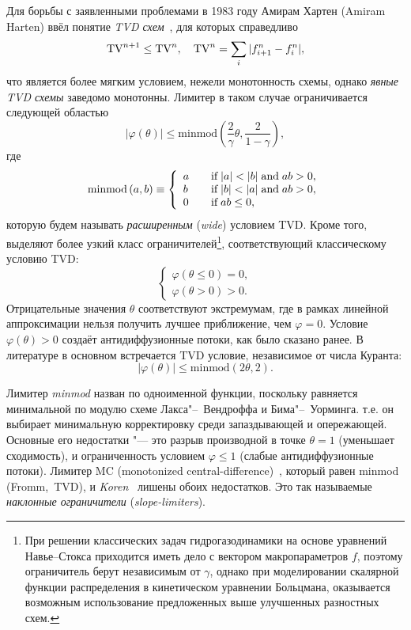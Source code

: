 Для борьбы с заявленными проблемами в 1983 году Амирам Хартен (Amiram Harten) ввёл понятие \textit{TVD схем}~\cite{Harten1983},
для которых справедливо
\[ \mathrm{TV}^{n+1}\le \mathrm{TV}^n, \quad \mathrm{TV}^n = \sum_i| f_{i+1}^n - f_i^n |, \]
что является более мягким условием, нежели монотонность схемы, однако \textit{явные TVD схемы} заведомо монотонны.
Лимитер в таком случае ограничивается следующей областью
\[ \left|\varphi(\theta)\right| \leq \mathrm{minmod}\left(\frac2{\gamma}\theta,\frac2{1-\gamma}\right), \] где
\[
\mathrm{minmod}\,(a,b) \equiv \left\{
\begin{array}{l l}
	a & \quad \text{if}\;|a|<|b| \;\text{and}\;ab>0, \\
	b & \quad \text{if}\;|b|<|a| \;\text{and}\;ab>0, \\
	0 & \quad \text{if}\;ab \leq 0,
\end{array}\right.
\]
которую будем называть \textit{расширенным} (\textit{wide}) условием TVD.
Кроме того, выделяют более узкий класс ограничителей\footnote{
	При решении классических задач гидрогазодинамики на основе уравнений Навье--Стокса приходится иметь дело с вектором макропараметров \(f\),
	поэтому ограничитель берут независимым от \(\gamma\), однако при моделировании скалярной функции распределения
	в кинетическом уравнении Больцмана, оказывается возможным использование предложенных выше улучшенных разностных схем.
}, соответствующий классическому условию TVD:
\[ \left\{
\begin{array}{l}
	\varphi(\theta\le0)=0, \\
	\varphi(\theta>0) > 0.
\end{array}\right.
\]
Отрицательные значения \(\theta\) соответствуют экстремумам, где в рамках линейной аппроксимации нельзя получить лучшее приближение, чем \(\varphi=0\).
Условие \(\varphi(\theta)>0\) создаёт антидиффузионные потоки, как было сказано ранее.
В литературе в основном встречается TVD условие, независимое от числа Куранта:
\[ \left|\varphi(\theta)\right| \leq \mathrm{minmod}(2\theta,2). \]

Лимитер \textit{minmod} назван по одноименной функции, поскольку равняется минимальной по модулю схеме Лакса"--~Вендроффа и Бима"--~Уорминга.
т.е. он выбирает минимальную корректировку среди запаздывающей и опережающей.
Основные его недостатки "--- это разрыв производной в точке \(\theta=1\) (уменьшает сходимость), и ограниченность условием \(\varphi\le1\)
(слабые антидиффузионные потоки). Лимитер MC (monotonized central-difference)~\cite{vanLeer1977}, который равен minmod\,\mbox{(Fromm, TVD)},
и \textit{Koren}~\cite{Koren1993} лишены обоих недостатков. Это так называемые \textit{наклонные ограничители} (\textit{slope-limiters}).

